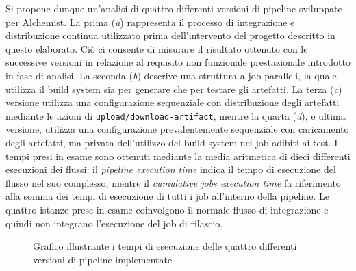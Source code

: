 Si propone dunque un'analisi di quattro differenti versioni di pipeline sviluppate per Alchemist. La prima (\textit{a}) rappresenta il processo di integrazione e distribuzione continua utilizzato prima dell'intervento del progetto descritto in questo elaborato. Ciò ci consente di misurare il risultato ottenuto con le successive versioni in relazione al requisito non funzionale prestazionale introdotto in fase di analisi. La seconda (\textit{b}) descrive una struttura a job paralleli, la quale utilizza il build system sia per generare che per testare gli artefatti. La terza (\textit{c}) versione utilizza una configurazione sequenziale con distribuzione degli artefatti mediante le azioni di \texttt{upload/download-artifact}, mentre la quarta (\textit{d}), e ultima versione, utilizza una configurazione prevalentemente sequenziale con caricamento degli artefatti, ma privata dell'utilizzo del build system nei job adibiti ai test. I tempi presi in esame sono ottenuti mediante la media aritmetica di dieci differenti esecuzioni dei flussi: il \textit{pipeline execution time} indica il tempo di esecuzione del flusso nel suo complesso, mentre il \textit{cumulative jobs execution time} fa riferimento alla somma dei tempi di esecuzione di tutti i job all'interno della pipeline. Le quattro istanze prese in esame coinvolgono il normale flusso di integrazione e quindi non integrano l'esecuzione del job di rilascio.

\begin{figure}[htb]
	\centering
	\caption{Grafico illustrante i tempi di esecuzione delle quattro differenti versioni di pipeline implementate}
	\label{fig:histogram}
\end{figure}
 
